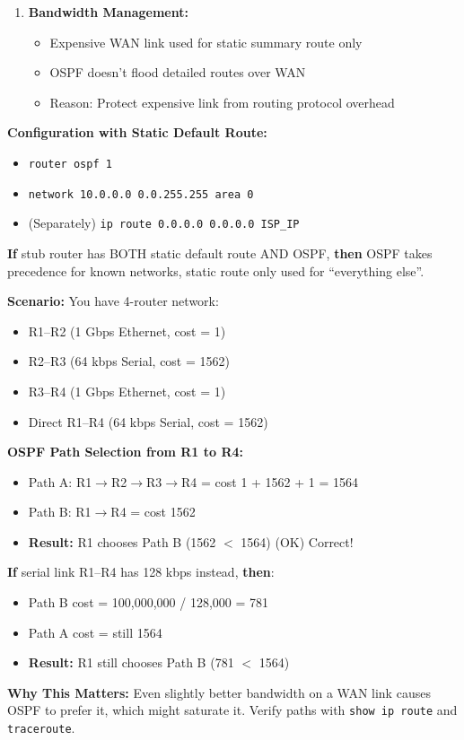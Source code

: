 \documentclass[12pt,a4paper]{article}
\begin{document}
\begin{abox}
\begin{enumerate}
    \item \textbf{Bandwidth Management:}
    \begin{itemize}
        \item Expensive WAN link used for static summary route only
        \item OSPF doesn't flood detailed routes over WAN
        \item Reason: Protect expensive link from routing protocol overhead
    \end{itemize}
\end{enumerate}

\textbf{Configuration with Static Default Route:}
\begin{itemize}
    \item \texttt{router ospf 1}
    \item \texttt{network 10.0.0.0 0.0.255.255 area 0}
    \item (Separately) \texttt{ip route 0.0.0.0 0.0.0.0 ISP\_IP}
\end{itemize}

\textbf{If} stub router has BOTH static default route AND OSPF, \textbf{then} OSPF takes precedence for known networks, static route only used for ``everything else''.
\end{abox}


\begin{condbox}
\textbf{Scenario:} You have 4-router network:
\begin{itemize}
    \item R1--R2 (1 Gbps Ethernet, cost = 1)
    \item R2--R3 (64 kbps Serial, cost = 1562)
    \item R3--R4 (1 Gbps Ethernet, cost = 1)
    \item Direct R1--R4 (64 kbps Serial, cost = 1562)
\end{itemize}

\textbf{OSPF Path Selection from R1 to R4:}
\begin{itemize}
    \item Path A: R1$\rightarrow$R2$\rightarrow$R3$\rightarrow$R4 = cost 1 + 1562 + 1 = 1564
    \item Path B: R1$\rightarrow$R4 = cost 1562
    \item \textbf{Result:} R1 chooses Path B (1562 $<$ 1564) (OK) Correct!
\end{itemize}

\textbf{If} serial link R1--R4 has 128 kbps instead, \textbf{then}:
\begin{itemize}
    \item Path B cost = 100,000,000 / 128,000 = 781
    \item Path A cost = still 1564
    \item \textbf{Result:} R1 still chooses Path B (781 $<$ 1564)
\end{itemize}

\textbf{Why This Matters:} Even slightly better bandwidth on a WAN link causes OSPF to prefer it, which might saturate it. Verify paths with \texttt{show ip route} and \texttt{traceroute}.
\end{condbox}
\end{document}
